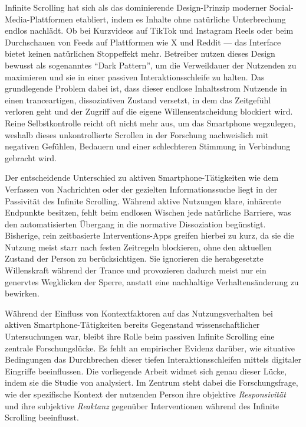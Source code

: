 \documentclass[11pt,a4paper]{article}
\begin{document}
Infinite Scrolling hat sich als das dominierende Design-Prinzip moderner
Social-Media-Plattformen etabliert, indem es Inhalte ohne natürliche Unterbrechung endlos
nachlädt. Ob bei Kurzvideos auf TikTok und Instagram Reels oder beim Durchschauen von
Feeds auf Plattformen wie X und Reddit --- das Interface bietet keinen natürlichen
Stoppeffekt mehr. Betreiber nutzen dieses Design bewusst als sogenanntes
\enquote{Dark Pattern}, um die Verweildauer der Nutzenden zu maximieren und sie in einer
passiven Interaktionsschleife zu halten. Das grundlegende Problem dabei ist, dass dieser
endlose Inhaltsstrom Nutzende in einen tranceartigen, dissoziativen Zustand versetzt, in
dem das Zeitgefühl verloren geht und der Zugriff auf die eigene Willensentscheidung
blockiert wird. Reine Selbstkontrolle reicht oft nicht mehr aus, um das Smartphone
wegzulegen, weshalb dieses unkontrollierte Scrollen in der Forschung nachweislich mit
negativen Gefühlen, Bedauern und einer schlechteren Stimmung in Verbindung gebracht wird.

Der entscheidende Unterschied zu aktiven Smartphone-Tätigkeiten wie dem Verfassen von
Nachrichten oder der gezielten Informationssuche liegt in der Passivität des Infinite
Scrolling. Während aktive Nutzungen klare, inhärente Endpunkte besitzen, fehlt beim
endlosen Wischen jede natürliche Barriere, was den automatisierten Übergang in die
normative Dissoziation begünstigt. Bisherige, rein zeitbasierte Interventions-Apps greifen
hierbei zu kurz, da sie die Nutzung meist starr nach festen Zeitregeln blockieren, ohne den
aktuellen Zustand der Person zu berücksichtigen. Sie ignorieren die herabgesetzte
Willenskraft während der Trance und provozieren dadurch meist nur ein genervtes Wegklicken
der Sperre, anstatt eine nachhaltige Verhaltensänderung zu bewirken.

Während der Einfluss von Kontextfaktoren auf das Nutzungsverhalten bei aktiven
Smartphone-Tätigkeiten bereits Gegenstand wissenschaftlicher Untersuchungen war, bleibt
ihre Rolle beim passiven Infinite Scrolling eine zentrale Forschungslücke. Es fehlt an
empirischer Evidenz darüber, wie situative Bedingungen das Durchbrechen dieser tiefen
Interaktionsschleifen mittels digitaler Eingriffe beeinflussen. Die vorliegende Arbeit
widmet sich genau dieser Lücke, indem sie die Studie von \citet{meinhardt2025scrolling}
analysiert. Im Zentrum steht dabei die Forschungsfrage, wie der spezifische Kontext der
nutzenden Person ihre objektive \emph{Responsivität} und ihre subjektive \emph{Reaktanz}
gegenüber Interventionen während des Infinite Scrolling beeinflusst.
\end{document}
